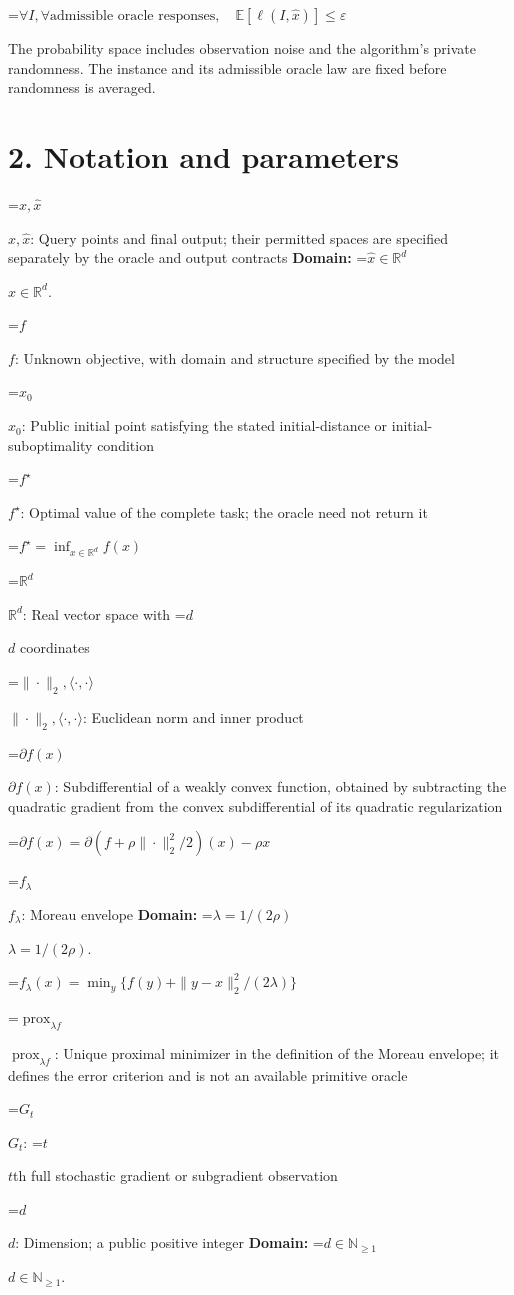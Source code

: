 \documentclass[10pt,a4paper]{article}
\newcommand{\AtlasMath}[1]{\par\begingroup\centering\setbox0=\hbox{$\displaystyle #1$}\ifdim\wd0>1.4\linewidth\typeout{ATLAS WIDE FORMULA: \the\wd0}\fi\ifdim\wd0>\linewidth\resizebox{\linewidth}{!}{\box0}\else\box0\fi\par\endgroup}
\newcommand{\AtlasInlineMath}[1]{\begingroup\setbox0=\hbox{$#1$}\ifdim\wd0>.4\linewidth\endgroup\AtlasMath{#1}\else\endgroup$#1$\fi}
\begin{document}
\AtlasMath{\forall I,\forall\text{admissible oracle responses},\quad\mathbb{E}[\ell(I,\widehat{x})]\le\varepsilon}


The probability space includes observation noise and the algorithm's private randomness. The instance and its admissible oracle law are fixed before randomness is averaged.

\section{2. Notation and parameters}
\AtlasInlineMath{x,\widehat{x}}: Query points and final output; their permitted spaces are specified separately by the oracle and output contracts \textbf{Domain:} \AtlasInlineMath{\widehat{x}\in \mathbb{R}^d}.

\AtlasInlineMath{f}: Unknown objective, with domain and structure specified by the model

\AtlasInlineMath{x_0}: Public initial point satisfying the stated initial-distance or initial-suboptimality condition

\AtlasInlineMath{f^\star}: Optimal value of the complete task; the oracle need not return it


\AtlasMath{f^\star=\inf_{x\in \mathbb{R}^d}f(x)}


\AtlasInlineMath{\mathbb{R}^d}: Real vector space with \AtlasInlineMath{d} coordinates

\AtlasInlineMath{\|\cdot\|_2,\langle\cdot,\cdot\rangle}: Euclidean norm and inner product

\AtlasInlineMath{\partial f(x)}: Subdifferential of a weakly convex function, obtained by subtracting the quadratic gradient from the convex subdifferential of its quadratic regularization


\AtlasMath{\partial f(x)=\partial(f+\rho\|\cdot\|_2^2/2)(x)-\rho x}


\AtlasInlineMath{f_\lambda}: Moreau envelope \textbf{Domain:} \AtlasInlineMath{\lambda=1/(2\rho)}.


\AtlasMath{f_\lambda(x)=\min_y\{f(y)+\|y-x\|_2^2/(2\lambda)\}}


\AtlasInlineMath{\operatorname{prox}_{\lambda f}}: Unique proximal minimizer in the definition of the Moreau envelope; it defines the error criterion and is not an available primitive oracle

\AtlasInlineMath{G_t}: \AtlasInlineMath{t}th full stochastic gradient or subgradient observation

\AtlasInlineMath{d}: Dimension; a public positive integer \textbf{Domain:} \AtlasInlineMath{d\in\mathbb{N}_{\ge1}}.
\end{document}
